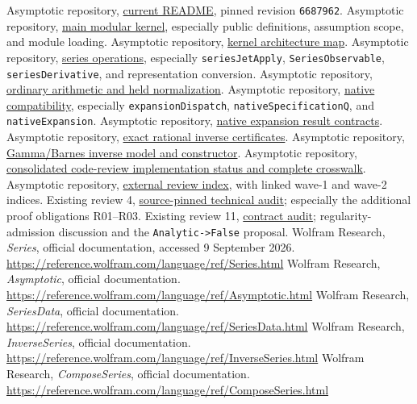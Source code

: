 \documentclass[11pt,letterpaper]{article}
\newcommand{\code}[1]{\nolinkurl{#1}}
\newcommand{\src}[2]{\href{https://github.com/VladimirReshetnikov/Asymptotic/blob/6687962f3c858a4f93623cfc496f33e35c6763d4/#1}{#2}}
\newcommand{\wlref}[1]{\url{https://reference.wolfram.com/language/ref/#1.html}}
\begin{document}
\begin{thebibliography}{99}
\small
{} Asymptotic repository, \src{README.md}{current README}, pinned revision \texttt{6687962}.
 Asymptotic repository, \src{src/Kernel/AsymptoticAnalysis.wl}{main modular kernel}, especially public definitions, assumption scope, and module loading.
 Asymptotic repository, \src{src/Kernel/README.md}{kernel architecture map}.
 Asymptotic repository, \src{src/Kernel/SeriesOperations.wl}{series operations}, especially \code{seriesJetApply}, \code{SeriesObservable}, \code{seriesDerivative}, and representation conversion.
 Asymptotic repository, \src{src/Kernel/SeriesArithmetic.wl}{ordinary arithmetic and held normalization}.
 Asymptotic repository, \src{src/Kernel/NativeCompatibility.wl}{native compatibility}, especially \code{expansionDispatch}, \code{nativeSpecificationQ}, and \code{nativeExpansion}.
 Asymptotic repository, \src{docs/development/NATIVE_RESULT_CONTRACTS.md}{native expansion result contracts}.
 Asymptotic repository, \src{src/Kernel/InverseCertificates.wl}{exact rational inverse certificates}.
 Asymptotic repository, \src{src/Kernel/GammaInverse.wl}{Gamma/Barnes inverse model and constructor}.
 Asymptotic repository, \src{docs/development/CODE_REVIEW_STATUS.md}{consolidated code-review implementation status and complete crosswalk}.
 Asymptotic repository, \src{external-reports/code-review/README.md}{external review index}, with linked wave-1 and wave-2 indices.
 Existing review 4, \src{external-reports/code-review/wave-1/code-review-4/article.tex}{source-pinned technical audit}; especially the additional proof obligations R01--R03.
 Existing review 11, \src{external-reports/code-review/wave-2/code-review-11/article/asymptotic-contract-audit.tex}{contract audit}; regularity-admission discussion and the \code{Analytic->False} proposal.
 Wolfram Research, \emph{Series}, official documentation, accessed 9 September 2026. \wlref{Series}
 Wolfram Research, \emph{Asymptotic}, official documentation. \wlref{Asymptotic}
 Wolfram Research, \emph{SeriesData}, official documentation. \wlref{SeriesData}
 Wolfram Research, \emph{InverseSeries}, official documentation. \wlref{InverseSeries}
 Wolfram Research, \emph{ComposeSeries}, official documentation. \wlref{ComposeSeries}

\end{thebibliography}
\end{document}
